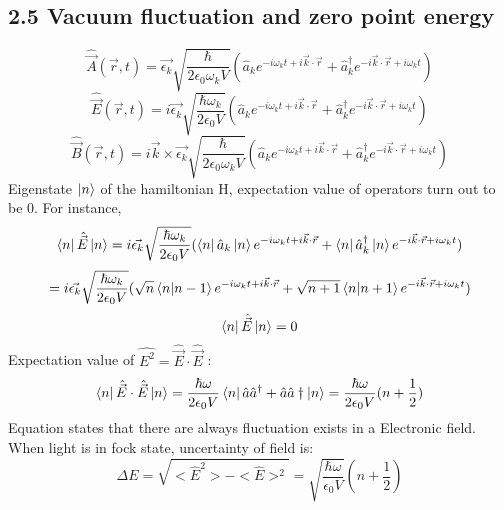 \documentclass[9pt]{article}
\begin{document}
\subsection{2.5 Vacuum fluctuation and zero point energy}
\begin{equation}
    \hat{\vec{A}}(\vec{r},t)=\vec{\epsilon_k}\sqrt{\frac{\hbar}{2\epsilon_0\omega_k V}}(\hat{a}_k e^{-i\omega_k t + i\vec{k}\cdot\vec{r}}+
    \hat{a}_k^\dagger e^{-i\vec{k}\cdot\vec{r} + i\omega_k t})
\end{equation}
\begin{equation}
    \hat{\vec{E}}(\vec{r},t)=i\vec{\epsilon_k}\sqrt{\frac{\hbar\omega_k}{2\epsilon_0 V}}(\hat{a}_k e^{-i\omega_k t + i\vec{k}\cdot\vec{r}}+
    \hat{a}_k^\dagger e^{-i\vec{k}\cdot\vec{r} + i\omega_k t})
\end{equation}
\begin{equation}
    \hat{\vec{B}}(\vec{r},t)=i\vec{k}\times\vec{\epsilon_k}\sqrt{\frac{\hbar}{2\epsilon_0\omega_k V}}(\hat{a}_k e^{-i\omega_k t + i\vec{k}\cdot\vec{r}}+
    \hat{a}_k^\dagger e^{-i\vec{k}\cdot\vec{r} + i\omega_k t})
\end{equation}
Eigenstate $\ket{n}$ of the hamiltonian H, expectation value of operators turn out to be 0. For instance, 
\begin{equation*}
    \bra{n}\hat{\vec{E}}\ket{n}=i\vec{\epsilon_k}\sqrt{\frac{\hbar\omega_k}{2\epsilon_0 V}}(\bra{n}\hat{a}_k\ket{n} e^{-i\omega_k t + i\vec{k}\cdot\vec{r}}+
    \bra{n}\hat{a}_k^\dagger\ket{n} e^{-i\vec{k}\cdot\vec{r} + i\omega_k t})
\end{equation*}
\begin{equation*}
    =i\vec{\epsilon_k}\sqrt{\frac{\hbar\omega_k}{2\epsilon_0 V}}(\sqrt{n}\bra{n}\ket{n-1} e^{-i\omega_k t + i\vec{k}\cdot\vec{r}}+
    \sqrt{n+1}\bra{n}\ket{n+1} e^{-i\vec{k}\cdot\vec{r} + i\omega_k t})
\end{equation*}
\begin{equation}
    \bra{n}\hat{\vec{E}}\ket{n}=0
\end{equation}
Expectation value of $\hat{E^2}=\hat{\vec{E}}\cdot\hat{\vec{E}}$ :
\begin{equation}
    \bra{n}\hat{\vec{E}}\cdot\hat{\vec{E}}\ket{n}=\frac{\hbar\omega}{2\epsilon_0 V}\bra{n}\hat{a}\hat{a}^\dagger+\hat{a}\hat{a}\dagger\ket{n}
    =\frac{\hbar\omega}{2\epsilon_0 V}(n+\frac{1}{2})
\end{equation}
Equation states that there are always fluctuation exists in a Electronic field. When light is in fock state, uncertainty of field is:
\begin{equation}
    \Delta{E}=\sqrt{<\hat{E}^2>-<\hat{E}>^2} = \sqrt{\frac{\hbar\omega}{\epsilon_0 V}}(n+\frac{1}{2})
\end{equation}
\end{document}
